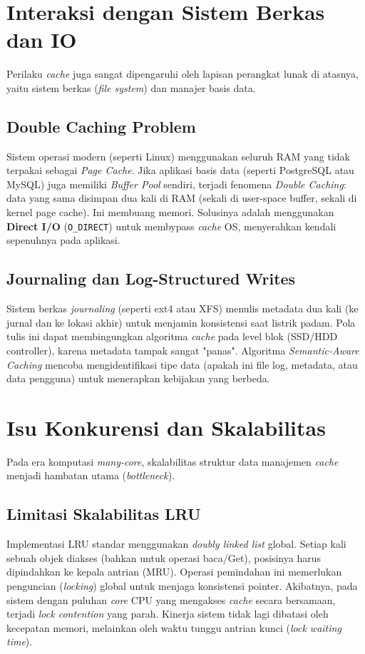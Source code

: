 \section{Interaksi dengan Sistem Berkas dan IO}
Perilaku \textit{cache} juga sangat dipengaruhi oleh lapisan perangkat lunak
di atasnya, yaitu sistem berkas (\textit{file system}) dan manajer basis data.

\subsection{Double Caching Problem}
Sistem operasi modern (seperti Linux) menggunakan seluruh RAM yang tidak
terpakai sebagai \textit{Page Cache}. Jika aplikasi basis data
(seperti PostgreSQL
atau MySQL) juga memiliki \textit{Buffer Pool} sendiri, terjadi fenomena
\textit{Double Caching}: data yang sama disimpan dua kali di RAM (sekali di
user-space buffer, sekali di kernel page cache). Ini membuang memori.
Solusinya adalah menggunakan \textbf{Direct I/O} (\texttt{O\_DIRECT}) untuk
membypass \textit{cache} OS, menyerahkan kendali sepenuhnya pada aplikasi.

\subsection{Journaling dan Log-Structured Writes}
Sistem berkas \textit{journaling} (seperti ext4 atau XFS) menulis metadata
dua kali (ke jurnal dan ke lokasi akhir) untuk menjamin konsistensi saat
listrik padam. Pola tulis ini dapat membingungkan algoritma \textit{cache}
pada level blok (SSD/HDD controller), karena metadata tampak sangat "panas".
Algoritma \textit{Semantic-Aware Caching} mencoba mengidentifikasi tipe data
(apakah ini file log, metadata, atau data pengguna) untuk menerapkan kebijakan
yang berbeda.

\section{Isu Konkurensi dan Skalabilitas}
Pada era komputasi \textit{many-core}, skalabilitas struktur data
manajemen \textit{cache} menjadi hambatan utama (\textit{bottleneck}).

\subsection{Limitasi Skalabilitas LRU}
Implementasi LRU standar menggunakan \textit{doubly linked list} global.
Setiap kali sebuah objek diakses (bahkan untuk operasi baca/Get),
posisinya harus dipindahkan ke kepala antrian (MRU).
Operasi pemindahan ini memerlukan penguncian (\textit{locking}) global
untuk menjaga konsistensi pointer.
Akibatnya, pada sistem dengan puluhan \textit{core} CPU yang mengakses
\textit{cache} secara bersamaan, terjadi \textit{lock contention} yang
parah. Kinerja sistem tidak lagi dibatasi oleh kecepatan memori, melainkan
oleh waktu tunggu antrian kunci (\textit{lock waiting time}).

